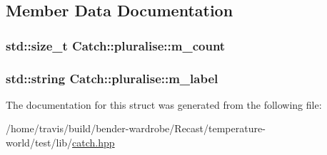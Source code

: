 \subsection{Member Data Documentation}
\hypertarget{struct_catch_1_1pluralise_a4dce2fa13ec6f00fac09b2418265441e}{
\subsubsection[{m\-\_\-count}]{\setlength{\rightskip}{0pt plus 5cm}std\-::size\-\_\-t Catch\-::pluralise\-::m\-\_\-count}}\label{struct_catch_1_1pluralise_a4dce2fa13ec6f00fac09b2418265441e}
\hypertarget{struct_catch_1_1pluralise_a8849cbdd3f11ebe7747597c8644e8793}{
\subsubsection[{m\-\_\-label}]{\setlength{\rightskip}{0pt plus 5cm}std\-::string Catch\-::pluralise\-::m\-\_\-label}}\label{struct_catch_1_1pluralise_a8849cbdd3f11ebe7747597c8644e8793}


The documentation for this struct was generated from the following file\-:\begin{DoxyCompactItemize}
\item 
/home/travis/build/bender-\/wardrobe/\-Recast/temperature-\/world/test/lib/\hyperlink{catch_8hpp}{catch.\-hpp}\end{DoxyCompactItemize}
